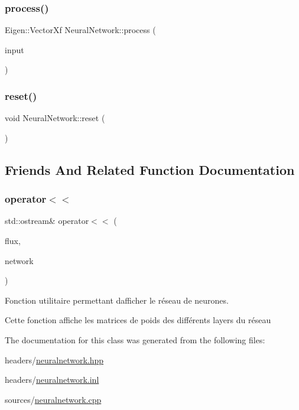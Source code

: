 \subsubsection{\texorpdfstring{process()}{process()}}
{\footnotesize\ttfamily Eigen\+::\+Vector\+Xf Neural\+Network\+::process (\begin{DoxyParamCaption}\item[{Eigen\+::\+Vector\+Xf}]{input }\end{DoxyParamCaption})}

\mbox{\label{classNeuralNetwork_a3e41ea08d6d8d80ba178322d1e0f1091}} 
\subsubsection{\texorpdfstring{reset()}{reset()}}
{\footnotesize\ttfamily void Neural\+Network\+::reset (\begin{DoxyParamCaption}{ }\end{DoxyParamCaption})}



\subsection{Friends And Related Function Documentation}
\mbox{\label{classNeuralNetwork_a0ecebf9a494437efb917804ed271e13f}} 
\subsubsection{\texorpdfstring{operator$<$$<$}{operator<<}}
{\footnotesize\ttfamily std\+::ostream\& operator$<$$<$ (\begin{DoxyParamCaption}\item[{std\+::ostream \&}]{flux,  }\item[{\hyperlink{classNeuralNetwork}{Neural\+Network}}]{network }\end{DoxyParamCaption})\hspace{0.3cm}{\ttfamily [friend]}}



Fonction utilitaire permettant d\textquotesingle{}afficher le réseau de neurones. 

Cette fonction affiche les matrices de poids des différents layers du réseau 

The documentation for this class was generated from the following files\+:\begin{DoxyCompactItemize}
\item 
headers/\hyperlink{neuralnetwork_8hpp}{neuralnetwork.\+hpp}\item 
headers/\hyperlink{neuralnetwork_8inl}{neuralnetwork.\+inl}\item 
sources/\hyperlink{neuralnetwork_8cpp}{neuralnetwork.\+cpp}\end{DoxyCompactItemize}
